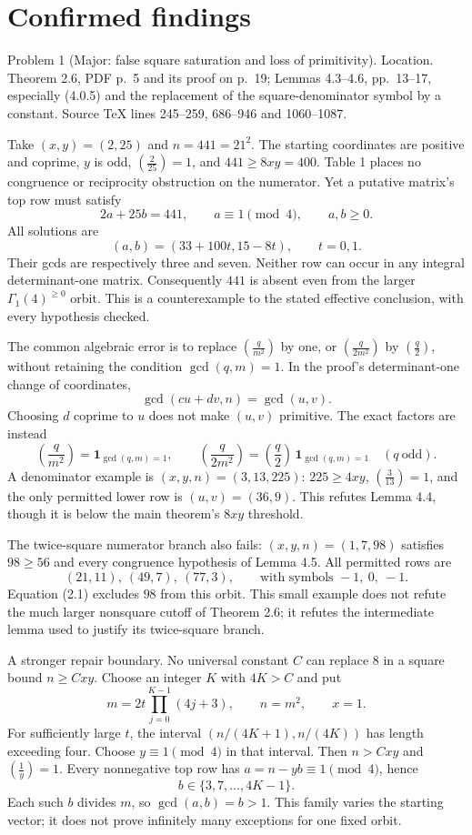 \documentclass[10pt]{article}
\begin{document}
\section*{Confirmed findings}
Problem 1 (Major: false square saturation and loss of primitivity).  Location. Theorem 2.6, PDF p. 5 and its proof on p. 19; Lemmas 4.3–4.6, pp. 13–17, especially (4.0.5) and the replacement of the square-denominator symbol by a constant. Source TeX lines 245–259, 686–946 and 1060–1087.\par
Take \((x,y)=(2,25)\) and \(n=441=21^2\). The starting coordinates are positive and coprime, \(y\) is odd, \(\left(\frac{2}{25}\right)=1\), and \(441\geq8xy=400\). Table 1 places no congruence or reciprocity obstruction on the numerator. Yet a putative matrix’s top row must satisfy \[2a+25b=441,\qquad a\equiv1\pmod4,\qquad a,b\geq0.\] All solutions are \[(a,b)=(33+100t,15-8t),\qquad t=0,1.\] Their gcds are respectively three and seven. Neither row can occur in any integral determinant-one matrix. Consequently \(441\) is absent even from the larger \(\Gamma_1(4)^{\geq0}\) orbit. This is a counterexample to the stated effective conclusion, with every hypothesis checked.\par
The common algebraic error is to replace \(\left(\frac{q}{m^2}\right)\) by one, or \(\left(\frac{q}{2m^2}\right)\) by \(\left(\frac{q}{2}\right)\), without retaining the condition \(\gcd(q,m)=1\). In the proof’s determinant-one change of coordinates, \[\gcd(cu+dv,n)=\gcd(u,v).\] Choosing \(d\) coprime to \(u\) does not make \((u,v)\) primitive. The exact factors are instead \[\left(\frac{q}{m^2}\right)=\mathbf1_{\gcd(q,m)=1},\qquad
 \left(\frac{q}{2m^2}\right)=\left(\frac{q}{2}\right)\,\mathbf1_{\gcd(q,m)=1}
 \quad(q\ \text{odd}).
 \tag{3.1}\] A denominator example is \((x,y,n)=(3,13,225)\): \(225\geq4xy\), \(\left(\frac{3}{13}\right)=1\), and the only permitted lower row is \((u,v)=(36,9)\). This refutes Lemma 4.4, though it is below the main theorem’s \(8xy\) threshold.\par
The twice-square numerator branch also fails: \((x,y,n)=(1,7,98)\) satisfies \(98\geq56\) and every congruence hypothesis of Lemma 4.5. All permitted rows are \[(21,11),\ (49,7),\ (77,3),
 \qquad\text{with symbols }-1,\ 0,\ -1.\] Equation (2.1) excludes \(98\) from this orbit. This small example does not refute the much larger nonsquare cutoff of Theorem 2.6; it refutes the intermediate lemma used to justify its twice-square branch.\par
A stronger repair boundary. No universal constant \(C\) can replace \(8\) in a square bound \(n\geq Cxy\). Choose an integer \(K\) with \(4K>C\) and put \[m=2t\prod_{j=0}^{K-1}(4j+3),\qquad n=m^2,\qquad x=1.\] For sufficiently large \(t\), the interval \((n/(4K+1),n/(4K))\) has length exceeding four. Choose \(y\equiv1\pmod4\) in that interval. Then \(n>Cxy\) and \(\left(\frac{1}{y}\right)=1\). Every nonnegative top row has \(a=n-yb\equiv1\pmod4\), hence \[b\in\{3,7,\ldots,4K-1\}.\] Each such \(b\) divides \(m\), so \(\gcd(a,b)=b>1\). This family varies the starting vector; it does not prove infinitely many exceptions for one fixed orbit.\par
\end{document}
